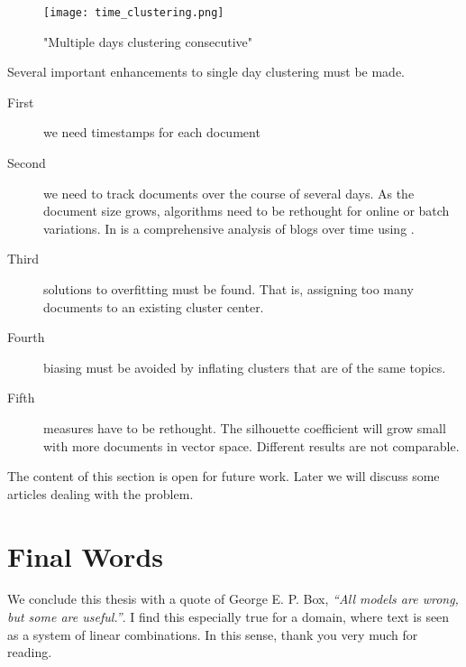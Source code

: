     \begin{figure}[h!]
      \centering
        \texttt{[image: time\_clustering.png]}
        \caption{"Multiple days clustering consecutive"}
        \label{time_clustering}
    \end{figure} 

  Several important enhancements to single day clustering must be made.

  \begin{description}
    \item[First] we need timestamps for each document
    \item[Second] we need to track documents over the course of several days. As the document size grows, algorithms need to be rethought for online or batch variations. In \cite{BlogTopicLDA2013} is a comprehensive analysis of blogs over time using \lda{}.
    \item[Third] solutions to overfitting must be found. That is, assigning too many documents to an existing cluster center.
    \item[Fourth] biasing must be avoided by inflating clusters that are of the same topics.
    \item[Fifth] measures have to be rethought. The silhouette coefficient will grow small with more documents in vector space. Different results are not comparable.
  \end{description}

  The content of this section is open for future work. Later we will discuss some articles dealing with the problem.

\section{Final Words}
We conclude this thesis with a quote of George E. P. Box, \emph{``All models are wrong, but some are useful.''}. I find this especially true for a domain, where text is seen as a system of linear combinations. In this sense, thank you very much for reading.

